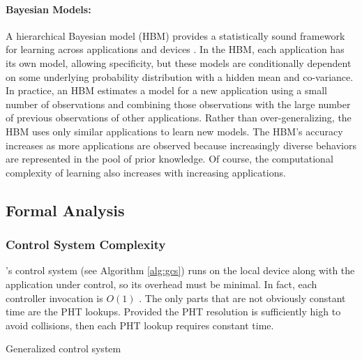 \paragraph{ Bayesian Models:} A hierarchical Bayesian model (HBM)
provides a statistically sound framework for learning across
applications and devices \cite{LEO}.  In the HBM, each application has
its own model, allowing specificity, but these models are
conditionally dependent on some underlying probability distribution
with a hidden mean and co-variance.  In practice, an HBM estimates a
model for a new application using a small number of observations and
combining those observations with the large number of previous
observations of other applications.  Rather than over-generalizing,
the HBM uses only similar applications to learn new models.  The HBM's
accuracy increases as more applications are observed because
increasingly diverse behaviors are represented in the pool of prior
knowledge.  Of course, the computational complexity of learning also
increases with increasing applications.


\subsection{Formal Analysis}
\subsubsection{Control System Complexity}

\SYSTEM{}'s control system (see Algorithm \ref{alg:gcs}) runs on the
local device along with the application under control, so its overhead
must be minimal.  In fact, each controller invocation is $O(1)$ .  The
only parts that are not obviously constant time are the PHT lookups.
Provided the PHT resolution is sufficiently high to avoid collisions,
then each PHT lookup requires constant time.
\begin{algorithm}[t]
\caption{Generalized control system}
\label{alg:gcs}
\end{algorithm}

